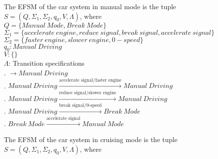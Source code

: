 \documentclass[12pt]{article}
\begin{document}
\begin{spacing}{1.5}

\newpage

\noindent The EFSM of the car system in manual mode is the tuple $S = (Q, \Sigma_1, \Sigma_2, q_0, V, \Lambda)$, where\\

\noindent $Q = \{Manual~Mode, Break~Mode\}$\\
\noindent $\Sigma_1 = \{accelerate~engine, reduce~signal, break~signal, accelerate~signal\}$\\
\noindent $\Sigma_2 = \{faster~engine, slower~engine, 0-speed\}$\\
\noindent $q_0: Manual~Driving$\\
\noindent $V: \{\}$\\
\noindent $\Lambda$: Transition specifications\\
. $\rightarrow Manual~Driving$\\
. $Manual~Driving \xrightarrow {\text {accelerate~signal/faster~engine}} Manual~Driving$\\
. $Manual~Driving \xrightarrow {\text {reduce~signal/slower~engine}} Manual~Driving$\\
. $Manual~Driving \xrightarrow {\text {break~signal/0-speed}} Break~Mode$\\
. $Break~Mode \xrightarrow {\text {accelerate~signal}} Manual~Mode$\\

\newpage

\noindent The EFSM of the car system in cruising mode is the tuple $S = (Q, \Sigma_1, \Sigma_2, q_0, V, \Lambda)$, where\\


\end{spacing}
\end{document}
